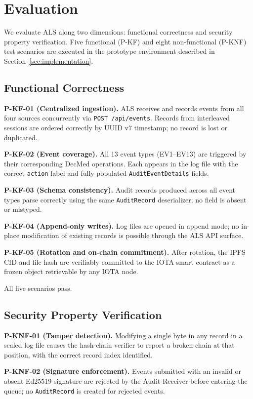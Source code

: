 \section{Evaluation}
\label{sec:evaluation}

We evaluate ALS along two dimensions: functional correctness and security
property verification. Five functional (P-KF) and eight non-functional
(P-KNF) test scenarios are executed in the prototype environment described
in Section~\ref{sec:implementation}.

\subsection{Functional Correctness}

\textbf{P-KF-01 (Centralized ingestion).} ALS receives and records events
from all four sources concurrently via \texttt{POST /api/events}. Records
from interleaved sessions are ordered correctly by UUID v7 timestamp;
no record is lost or duplicated.

\textbf{P-KF-02 (Event coverage).} All 13 event types (EV1--EV13) are
triggered by their corresponding DecMed operations. Each appears in the log
file with the correct \texttt{action} label and fully populated
\texttt{AuditEventDetails} fields.

\textbf{P-KF-03 (Schema consistency).} Audit records produced across all
event types parse correctly using the same \texttt{AuditRecord}
deserializer; no field is absent or mistyped.

\textbf{P-KF-04 (Append-only writes).} Log files are opened in append mode;
no in-place modification of existing records is possible through the ALS
API surface.

\textbf{P-KF-05 (Rotation and on-chain commitment).} After rotation, the
IPFS CID and file hash are verifiably committed to the IOTA smart contract
as a frozen object retrievable by any IOTA node.

All five scenarios pass.

\subsection{Security Property Verification}

\textbf{P-KNF-01 (Tamper detection).} Modifying a single byte in any
record in a sealed log file causes the hash-chain verifier to report a
broken chain at that position, with the correct record index identified.

\textbf{P-KNF-02 (Signature enforcement).} Events submitted with an invalid
or absent Ed25519 signature are rejected by the Audit Receiver before
entering the queue; no \texttt{AuditRecord} is created for rejected events.

